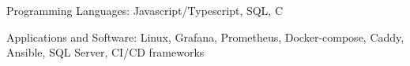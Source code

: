 
\begin{cvskills}
  \cvskill
    {Programming Languages:} %
    {Javascript/Typescript, SQL, C} %

  \cvskill
    {Applications and Software:} %
    {Linux, Grafana, Prometheus, Docker-compose, Caddy, Ansible, SQL Server, CI/CD frameworks} %
\end{cvskills}
